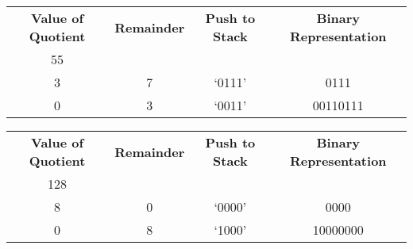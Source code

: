\documentclass[12pt]{article}
\begin{document}
\begin{center}
  \begin{tabular}{c|c|c|c}
    \textbf{Value of Quotient} & \textbf{Remainder} & \textbf{Push to Stack} & \textbf{Binary Representation} \\
    55 &   &        & \\
    3  & 7 & `0111' & 0111 \\
    0  & 3 & `0011' & 00110111
  \end{tabular}
\end{center}

\begin{center}
  \begin{tabular}{c|c|c|c}
    \textbf{Value of Quotient} & \textbf{Remainder} & \textbf{Push to Stack} & \textbf{Binary Representation} \\
    128 &   &        & \\
    8   & 0 & `0000' & 0000 \\
    0   & 8 & `1000' & 10000000
  \end{tabular}
\end{center}
\end{document}
